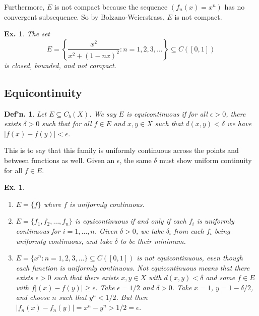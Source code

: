 \documentclass[12pt, a4paper]{book}
\newtheorem{definition}[theorem]{Def'n.}
\newtheorem{example}[theorem]{Ex.}
\theoremstyle{nonumberplain}
\begin{document}
Furthermore, $E$ is not compact because the sequence $(f_n(x)=x^n)$ has no convergent subsequence.
So by Bolzano-Weierstrass, $E$ is not compact.
\begin{example}
    The set
    \[E=\left\{\frac{x^2}{x^2+(1-nx)^2}:n=1,2,3,\ldots\right\}\subseteq C([0,1])\]
    is closed, bounded, and not compact.
\end{example}
\subsection{Equicontinuity}
\begin{definition}
    Let $E\subseteq C_b(X)$.
    We say $E$ is equicontinuous if for all $\epsilon>0$, there exists $\delta>0$ such that for all $f\in E$
    and $x,y\in X$ such that $d(x,y)<\delta$ we have $|f(x)-f(y)|<\epsilon$.
\end{definition}
This is to say that this family is uniformly continuous across the points and between functions as well.
Given an $\epsilon$, the same $\delta$ must show uniform continuity for all $f\in E$.
\begin{example}
    \begin{enumerate}
        \item $E=\{f\}$ where $f$ is uniformly continuous.
        \item $E=\{f_1,f_2,\ldots,f_n\}$ is equicontinuous if and only if each $f_i$ is uniformly continuous for $i=1,\ldots,n$.
            Given $\delta>0$, we take $\delta_i$ from each $f_i$ being uniformly continuous, and take $\delta$ to be their minimum.
        \item $E=\{x^n:n=1,2,3,\ldots\}\subseteq C([0,1])$ is not equicontinuous, even though each function is uniformly continuous.
            Not equicontinuous means that there exists $\epsilon>0$ such that there exists $x,y\in X$ with $d(x,y)<\delta$
            and some $f\in E$ with $f|(x)-f(y)|\geq\epsilon$. Take $\epsilon=1/2$ and $\delta>0$. Take $x=1$, $y=1-\delta/2$,
            and choose $n$ such that $y^n<1/2$. But then $|f_n(x)-f_n(y)|=x^n-y^n>1/2=\epsilon$.
    \end{enumerate}
\end{example}
\end{document}
